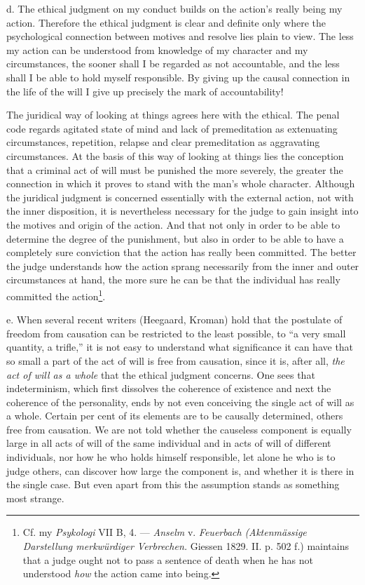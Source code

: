 \documentclass[12pt,a4paper,openany]{book}
\newcommand{\opage}[1]{\marginnote{\footnotesize\textit{[#1]}}}
\begin{document}
d. The ethical judgment on my conduct builds on the action's really being my action. Therefore the
ethical judgment is clear and definite only where the psychological connection between motives and
resolve lies plain to view. The less my action can be understood from knowledge of my character and my
circumstances, the sooner shall I be regarded as not accountable, and the less shall I be able to hold
myself responsible. By giving up the causal connection in the life of the will I give up precisely the
mark of accountability!

The juridical way of looking at things agrees here with the ethical. The penal code regards agitated state
of mind and lack of premeditation as extenuating circumstances, repetition, relapse and clear
premeditation as aggravating circumstances. At the basis of this way of looking at things lies the
conception that a criminal act of will must be punished the more severely, the greater the connection in
which it proves to stand with the man's whole character. Although the juridical judgment is concerned
essentially with the external action, not with the inner disposition, it is nevertheless necessary for
the judge to gain insight into the motives and origin of the action. And that not only in order to be
able to determine the degree of the punishment, but also in order to be able to have a completely sure
conviction that the action has really been committed. The better the judge understands how the action
sprang necessarily from the inner and outer circumstances at hand, the more sure he can be that the
individual has really committed the action\footnote[1]{Cf. my \textit{Psykologi} VII B, 4. ---
\emph{Anselm} v. \emph{Feuerbach} \textit{(Aktenmässige Darstellung merkwürdiger Verbrechen.} Giessen
1829. II. p. 502 f.) maintains that a judge ought not to pass a sentence of death when he has not
understood \textit{how} the action came into being.}.

e. When several recent writers (Heegaard, Kroman) hold that the postulate of freedom from causation can be
restricted to the least possible, to ``a very small quantity, a trifle,'' it is not easy to understand
what significance it can have that so small a part of the act of will is free from causation, since it
is, after all, \textit{the act of will as a whole} that the ethical judgment concerns.
One sees that
\opage{116}indeterminism, which first dissolves the coherence of existence and next the coherence of the
personality, ends by not even conceiving the single act of will as a whole. Certain per cent of its
elements are to be causally determined, others free from causation. We are not told whether the
causeless component is equally large in all acts of will of the same individual and in acts of will of
different individuals, nor how he who holds himself responsible, let alone he who is to judge others,
can discover how large the component is, and whether it is there in the single case. But even apart
from this the assumption stands as something most strange.
\end{document}
